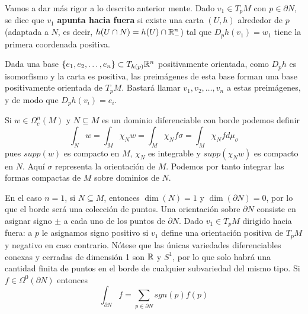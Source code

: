 \documentclass[CV.tex]{subfiles}
\begin{document}
Vamos a dar más rigor a lo descrito anterior mente. Dado $v_1\in T_pM$ con $p\in\partial N$, se dice que $v_1$ \textbf{apunta hacia fuera} si existe una carta $(U,h)$ alrededor de $p$ (adaptada a $N$, es decir, $h(U\cap N)=h(U)\cap \mathbb{R}^n_-$) tal que $D_ph(v_1)=w_1$ tiene la primera coordenada positiva. 

Dada una base $\{e_1,e_2,\dots, e_n\}\subset T_{h(p)}\mathbb{R}^n$ positivamente orientada, como $D_ph$ es isomorfismo y la carta es positiva, las preimágenes de esta base forman una base positivamente orientada de $T_pM$. Bastará llamar $v_1,v_2,\dots, v_n$ a estas preimágenes, y de modo que $D_ph(v_i)=e_i$. 

\begin{nota}
Si $w\in\Omega_c^n(M)$ y $N\subseteq M$ es un dominio diferenciable con borde podemos definir
\[
\int_N w=\int_M\chi_N w=\int_M \chi_N f\sigma=\int_M \chi_N f d\mu_{\sigma}
\]
pues $supp(w)$ es compacto en $M$, $\chi_N$ es integrable y $supp(\chi_Nw)$ es compacto en $N$. Aquí $\sigma$ representa la orientación de $M$. Podemos por tanto integrar las formas compactas de $M$ sobre dominios de $N$.

En el caso $n=1$, si $N\subseteq M$, entonces $\dim(N)=1$ y $\dim(\partial N)=0$, por lo que el borde será una colección de puntos. Una orientación sobre $\partial N$ consiste en asignar signo $\pm$ a cada uno de los puntos de $\partial N$. Dado $v_1\in T_pM$ dirigido hacia fuera: a $p$ le asignamos signo positivo si $v_1$ define una orientación positiva de $T_pM$ y negativo en caso contrario. Nótese que las únicas variedades diferenciables conexas y cerradas de dimensión 1 son $\mathbb{R}$ y $S^1$, por lo que solo habrá una cantidad finita de puntos en el borde de cualquier subvariedad del mismo tipo. Si $f\in\Omega^0(\partial N)$ entonces 
\[
\int_{\partial N} f=\sum_{p\in\partial N} sgn(p)f(p)
\]
\end{nota}
\end{document}
